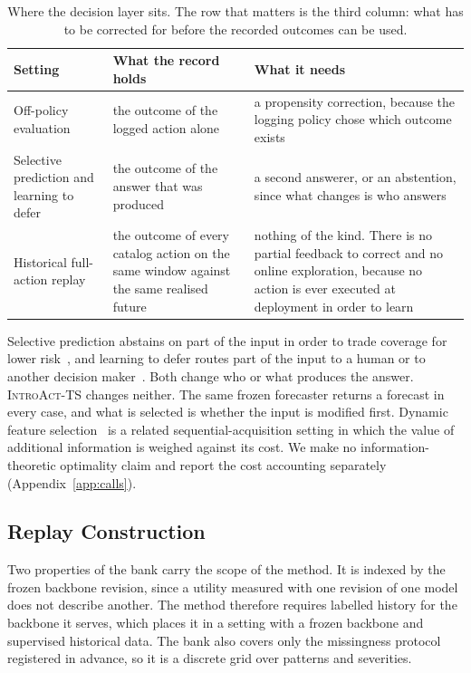 \documentclass{article}
\newcommand{\introact}{\textsc{IntroAct-TS}}
\begin{document}
\begin{table}[htbp]
  \caption{Where the decision layer sits. The row that matters is the third column: what has to
  be corrected for before the recorded outcomes can be used.}
  \label{tab:app-positioning}
  \centering
  \small
  \setlength{\tabcolsep}{4pt}
\begin{tabular}{@{}p{} p{} p{}@{}}
    \toprule
    Setting & What the record holds & What it needs \\
    \midrule
    Off-policy evaluation & the outcome of the logged action alone & a propensity correction, because the logging policy chose which outcome exists \\
    Selective prediction and learning to defer & the outcome of the answer that was produced & a second answerer, or an abstention, since what changes is who answers \\
    Historical full-action replay & the outcome of every catalog action on the same window against the same realised future & nothing of the kind. There is no partial feedback to correct and no online exploration, because no action is ever executed at deployment in order to learn \\
    \bottomrule
  \end{tabular}
\end{table}

Selective prediction abstains on part of the input in order to trade coverage for lower
risk~\citep{chow1970optimum,vovk2005algorithmic,geifman2017selective,lei2018distribution}, and
learning to defer routes part of the input to a human or to another decision
maker~\citep{madras2018predict,mozannar2020consistent}. Both change who or what produces the
answer. \introact{} changes neither. The same frozen forecaster returns a forecast in every
case, and what is selected is whether the input is modified first. Dynamic feature
selection~\citep{he2024dime} is a related sequential-acquisition setting in which the value of
additional information is weighed against its cost. We make no information-theoretic
optimality claim and report the cost accounting separately (Appendix~\ref{app:calls}).

\subsection{Replay Construction}
\label{app:replay}
Two properties of the bank carry the scope of the method. It is indexed by the frozen backbone
revision, since a utility measured with one revision of one model does not describe another.
The method therefore requires labelled history for the backbone it serves, which places it in
a setting with a frozen backbone and supervised historical data. The bank also
covers only the missingness protocol registered in advance, so it is a discrete grid over
patterns and severities.
\end{document}
